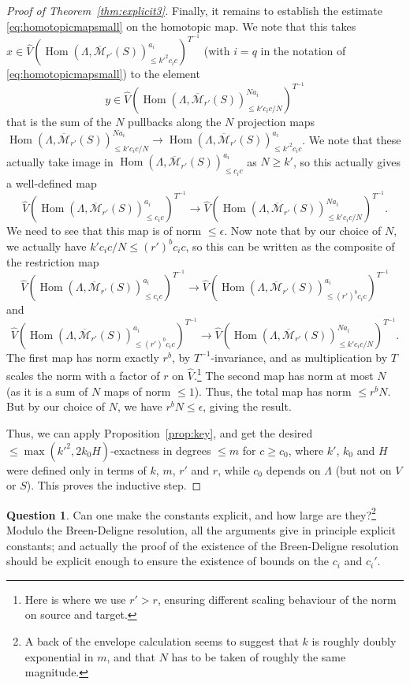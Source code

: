 \documentclass[11pt]{amsbook}
\DeclareMathOperator{\Hom}{Hom}
\numberwithin{equation}{section}
\numberwithin{theorem}{section}
\theoremstyle{definition}
\newtheorem{question}[theorem]{Question}
\begin{document}
\begin{proof}[Proof of Theorem~\ref{thm:explicit3}]
Finally, it remains to establish the estimate \eqref{eq:homotopicmapsmall} on the homotopic map. We note that this takes $x\in \widehat{V}(\Hom(\Lambda,\overline{\mathcal M}_{r'}(S))_{\leq k'^2c_ic}^{a_i})^{T^{-1}}$ (with $i=q$ in the notation of \eqref{eq:homotopicmapsmall}) to the element
\[
y\in \widehat{V}(\Hom(\Lambda,\overline{\mathcal M}_{r'}(S))_{\leq k'c_ic/N}^{Na_i})^{T^{-1}}
\]
that is the sum of the $N$ pullbacks along the $N$ projection maps $\Hom(\Lambda,\overline{\mathcal M}_{r'}(S))_{\leq k'c_ic/N}^{Na_i}\to \Hom(\Lambda,\overline{\mathcal M}_{r'}(S))_{\leq k'^2c_ic}^{a_i}$. We note that these actually take image in $\Hom(\Lambda,\overline{\mathcal M}_{r'}(S))_{\leq c_ic}^{a_i}$ as $N\geq k'$, so this actually gives a well-defined map
\[
\widehat{V}(\Hom(\Lambda,\overline{\mathcal M}_{r'}(S))_{\leq c_ic}^{a_i})^{T^{-1}}\to \widehat{V}(\Hom(\Lambda,\overline{\mathcal M}_{r'}(S))_{\leq k'c_ic/N}^{Na_i})^{T^{-1}}.
\]
We need to see that this map is of norm $\leq \epsilon$. Now note that by our choice of $N$, we actually have $k'c_ic/N\leq (r')^b c_ic$, so this can be written as the composite of the restriction map
\[
\widehat{V}(\Hom(\Lambda,\overline{\mathcal M}_{r'}(S))_{\leq c_ic}^{a_i})^{T^{-1}}\to \widehat{V}(\Hom(\Lambda,\overline{\mathcal M}_{r'}(S))_{\leq (r')^b c_ic}^{a_i})^{T^{-1}}
\]
and
\[
\widehat{V}(\Hom(\Lambda,\overline{\mathcal M}_{r'}(S))_{\leq (r')^b c_ic}^{a_i})^{T^{-1}}\to \widehat{V}(\Hom(\Lambda,\overline{\mathcal M}_{r'}(S))_{\leq k'c_ic/N}^{Na_i})^{T^{-1}}.
\]
The first map has norm exactly $r^b$, by $T^{-1}$-invariance, and as multiplication by $T$ scales the norm with a factor of $r$ on $\widehat{V}$.\footnote{Here is where we use $r'>r$, ensuring different scaling behaviour of the norm on source and target.} The second map has norm at most $N$ (as it is a sum of $N$ maps of norm $\leq 1$). Thus, the total map has norm $\leq r^bN$. But by our choice of $N$, we have $r^bN\leq \epsilon$, giving the result.

Thus, we can apply Proposition~\ref{prop:key}, and get the desired $\leq \max(k'^2,2k_0H)$-exactness in degrees $\leq m$ for $c\geq c_0$, where $k'$, $k_0$ and $H$ were defined only in terms of $k$, $m$, $r'$ and $r$, while $c_0$ depends on $\Lambda$ (but not on $V$ or $S$). This proves the inductive step.
\end{proof}

\begin{question} Can one make the constants explicit, and how large are they?\footnote{A back of the envelope calculation seems to suggest that $k$ is roughly doubly exponential in $m$, and that $N$ has to be taken of roughly the same magnitude.} Modulo the Breen-Deligne resolution, all the arguments give in principle explicit constants; and actually the proof of the existence of the Breen-Deligne resolution should be explicit enough to ensure the existence of bounds on the $c_i$ and $c_i'$.
\end{question}
\end{document}

